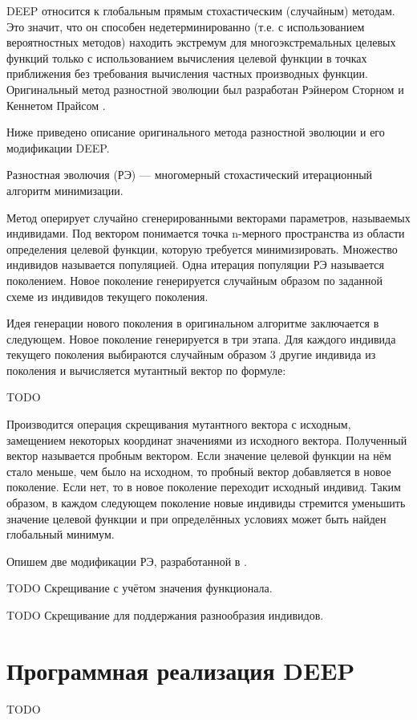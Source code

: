 DEEP относится к глобальным прямым стохастическим (случайным) методам.
Это значит, что он способен недетерминированно (т.е. с использованием вероятностных методов) находить экстремум для многоэкстремальных целевых функций только с использованием вычисления целевой функции в точках приближения без требования вычисления частных производных функции.
Оригинальный метод разностной эволюции был разработан Рэйнером Сторном и Кеннетом Прайсом \cite{Storn95}.

Ниже приведено описание оригинального метода разностной эволюции и его модификации DEEP.

Разностная эволючия (РЭ) --- многомерный стохастический итерационный алгоритм минимизации.

Метод оперирует случайно сгенерированными векторами параметров, называемых индивидами. 
Под вектором понимается точка n-мерного пространства из области определения целевой функции, которую требуется минимизировать.
Множество индивидов называется популяцией.
Одна итерация популяции РЭ называется поколением.
Новое поколение генерируется случайным образом по заданной схеме из индивидов текущего поколения.

Идея генерации нового поколения в оригинальном алгоритме заключается в следующем.
Новое поколение генерируется в три этапа.
Для каждого индивида текущего поколения выбираются случайным образом 3 другие индивида из поколения и вычисляется мутантный вектор по формуле:

TODO

Производится операция скрещивания мутантного вектора с исходным, замещением некоторых координат значениями из исходного вектора.
Полученный вектор называется пробным вектором.
Если значение целевой функции на нём стало меньше, чем было на исходном, то пробный вектор добавляется в новое поколение.
Если нет, то в новое поколение переходит исходный индивид.
Таким образом, в каждом следующем поколение новые индивиды стремится уменьшить значение целевой функции и при определённых условиях может быть найден глобальный минимум.

Опишем две модификации РЭ, разработанной в \cite{KozlovThesis}.

TODO Скрещивание с учётом значения функционала.

TODO Скрещивание для поддержания разнообразия индивидов.

\section*{Программная реализация DEEP}
TODO


